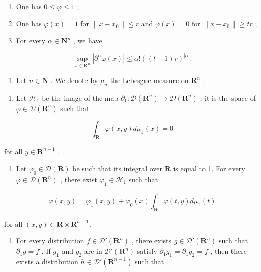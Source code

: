 \begin{enumerate}
\def\labelenumi{(\roman{enumi})}
\item
  One has \(0 \leqslant \varphi \leqslant 1\) ;
\item
  One has \(\varphi(x)=1\) for \(\|x-x_{0}\|\leqslant r\) and \(\varphi(x)=0\) for \(\|x-x_{0}\|\geqslant tr\) ;
\item
  For every \(\alpha \in \mathbf{N}^n\) , we have
\end{enumerate}

\[
\sup _ {x \in \mathbf {R} ^ {n}} | \partial^ {\alpha} \varphi (x) | \leqslant \alpha ! ((t - 1) r) ^ {| \alpha |}.
\]

\begin{enumerate}
\def\labelenumi{\arabic{enumi})}
\setcounter{enumi}{2}
\tightlist
\item
  Let \(n \in \mathbf{N}\) . We denote by \(\mu_n\) the Lebesgue measure on \(\mathbf{R}^n\) .
\end{enumerate}

\begin{enumerate}
\def\labelenumi{\alph{enumi})}
\tightlist
\item
  Let \(\mathcal{H}_1\) be the image of the map \(\partial_1\colon \mathcal{D}(\mathbf{R}^n)\to \mathcal{D}(\mathbf{R}^n)\) ; it is the space of \(\varphi \in \mathcal{D}(\mathbf{R}^n)\) such that
\end{enumerate}

\[
\int_ {\mathbf {R}} \varphi (x, y) d \mu_ {1} (x) = 0
\]

for all \(y \in \mathbf{R}^{n-1}\) .

\begin{enumerate}
\def\labelenumi{\alph{enumi})}
\setcounter{enumi}{1}
\tightlist
\item
  Let \(\varphi_0\in \mathcal{D}(\mathbf{R})\) be such that its integral over \(\mathbf{R}\) is equal to 1. For every \(\varphi \in \mathcal{D}(\mathbf{R}^n)\) , there exist \(\varphi_{1}\in \mathcal{H}_{1}\) such that
\end{enumerate}

\[
\varphi (x, y) = \varphi_ {1} (x, y) + \varphi_ {0} (x) \int_ {\mathbf {R}} \varphi (t, y) d \mu_ {1} (t)
\]

for all \((x,y)\in \mathbf{R}\times \mathbf{R}^{n - 1}\).

\begin{enumerate}
\def\labelenumi{\alph{enumi})}
\setcounter{enumi}{2}
\tightlist
\item
  For every distribution \(f \in \mathcal{D}'(\mathbf{R}^{n})\) , there exists \(g \in \mathcal{D}'(\mathbf{R}^{n})\) such that \(\partial_{1}g = f\) . If \(g_{1}\) and \(g_{2}\) are in \(\mathcal{D}'(\mathbf{R}^{n})\) satisfy \(\partial_{1}g_{1} = \partial_{1}g_{2} = f\) , then there exists a distribution \(h \in \mathcal{D}'(\mathbf{R}^{n-1})\) such that
\end{enumerate}

